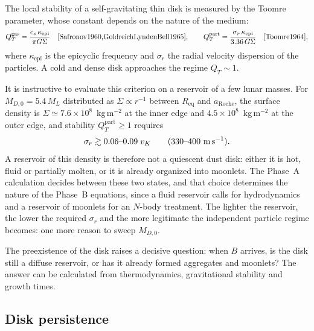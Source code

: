 \documentclass[11pt,a4paper,openany]{report}
\newcommand{\Req}{R_{\mathrm{eq}}}
\newcommand{\aR}{a_{\mathrm{Roche}}}
\begin{document}
The local stability of a self-gravitating thin disk is measured by the Toomre parameter, whose
constant depends on the nature of the medium:
\begin{equation}
Q_T^{\mathrm{gas}}=\frac{c_s\,\kappa_{\mathrm{epi}}}{\pi G\Sigma}
\quad\text{\cite{Safronov1960,GoldreichLyndenBell1965}},
\qquad
Q_T^{\mathrm{part}}=\frac{\sigma_r\,\kappa_{\mathrm{epi}}}{3.36\,G\Sigma}
\quad\text{\cite{Toomre1964}},
\label{eq:Toomre}
\end{equation}
where $\kappa_{\mathrm{epi}}$ is the epicyclic frequency and $\sigma_r$ the radial velocity
dispersion of the particles. A cold and dense disk approaches the regime $Q_T\sim1$.

It is instructive to evaluate this criterion on a reservoir of a few lunar masses. For
$M_{D,0}=5.4\,M_L$ distributed as $\Sigma\propto r^{-1}$ between $\Req$ and $\aR$, the surface
density is $\Sigma\simeq7.6\times10^{8}$~kg\,m$^{-2}$ at the inner edge and
$4.5\times10^{8}$~kg\,m$^{-2}$ at the outer edge, and stability $Q_T^{\mathrm{part}}\ge1$ requires
\begin{equation}
\sigma_r\gtrsim0.06\text{--}0.09\;v_K\qquad(330\text{--}400\ \text{m\,s}^{-1}).
\label{eq:sigmar-reservoir}
\end{equation}
A reservoir of this density is therefore not a quiescent dust disk: either it is hot, fluid or
partially molten, or it is already organized into moonlets. The Phase~A calculation decides between
these two states, and that choice determines the nature of the Phase~B equations, since a fluid
reservoir calls for hydrodynamics and a reservoir of moonlets for an $N$-body treatment. The
lighter the reservoir, the lower the required $\sigma_r$ and the more legitimate the independent
particle regime becomes: one more reason to sweep $M_{D,0}$.

\begin{ideephys}
The preexistence of the disk raises a decisive question: when $B$ arrives, is the disk still a
diffuse reservoir, or has it already formed aggregates and moonlets? The answer can be calculated
from thermodynamics, gravitational stability and growth times.
\end{ideephys}

\subsection{Disk persistence}
\end{document}
